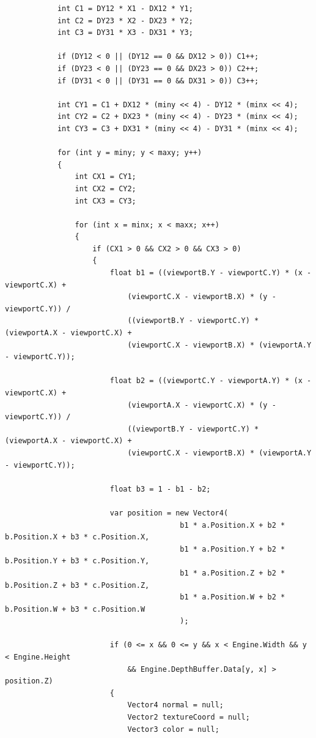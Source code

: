 \documentclass[a4paper,itemph,amsmath,oneside,11pt,openany]{xoblivoir}
\begin{document}
\begin{verbatim}
            int C1 = DY12 * X1 - DX12 * Y1;
            int C2 = DY23 * X2 - DX23 * Y2;
            int C3 = DY31 * X3 - DX31 * Y3;

            if (DY12 < 0 || (DY12 == 0 && DX12 > 0)) C1++;
            if (DY23 < 0 || (DY23 == 0 && DX23 > 0)) C2++;
            if (DY31 < 0 || (DY31 == 0 && DX31 > 0)) C3++;

            int CY1 = C1 + DX12 * (miny << 4) - DY12 * (minx << 4);
            int CY2 = C2 + DX23 * (miny << 4) - DY23 * (minx << 4);
            int CY3 = C3 + DX31 * (miny << 4) - DY31 * (minx << 4);

            for (int y = miny; y < maxy; y++)
            {
                int CX1 = CY1;
                int CX2 = CY2;
                int CX3 = CY3;

                for (int x = minx; x < maxx; x++)
                {
                    if (CX1 > 0 && CX2 > 0 && CX3 > 0)
                    {
                        float b1 = ((viewportB.Y - viewportC.Y) * (x - viewportC.X) +
                            (viewportC.X - viewportB.X) * (y - viewportC.Y)) /
                            ((viewportB.Y - viewportC.Y) * (viewportA.X - viewportC.X) +
                            (viewportC.X - viewportB.X) * (viewportA.Y - viewportC.Y));

                        float b2 = ((viewportC.Y - viewportA.Y) * (x - viewportC.X) +
                            (viewportA.X - viewportC.X) * (y - viewportC.Y)) /
                            ((viewportB.Y - viewportC.Y) * (viewportA.X - viewportC.X) +
                            (viewportC.X - viewportB.X) * (viewportA.Y - viewportC.Y));

                        float b3 = 1 - b1 - b2;

                        var position = new Vector4(
                                        b1 * a.Position.X + b2 * b.Position.X + b3 * c.Position.X,
                                        b1 * a.Position.Y + b2 * b.Position.Y + b3 * c.Position.Y,
                                        b1 * a.Position.Z + b2 * b.Position.Z + b3 * c.Position.Z,
                                        b1 * a.Position.W + b2 * b.Position.W + b3 * c.Position.W
                                        );

                        if (0 <= x && 0 <= y && x < Engine.Width && y < Engine.Height
                            && Engine.DepthBuffer.Data[y, x] > position.Z)
                        {
                            Vector4 normal = null;
                            Vector2 textureCoord = null;
                            Vector3 color = null;


\end{verbatim}
\end{document}
